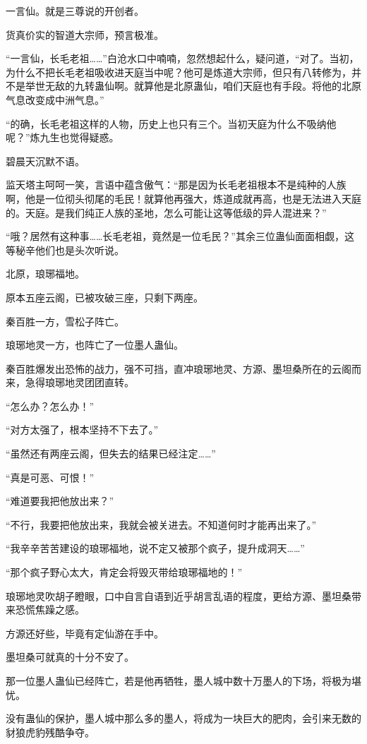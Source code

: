 \begin{this_body}
一言仙。就是三尊说的开创者。

货真价实的智道大宗师，预言极准。

“一言仙，长毛老祖……”白沧水口中喃喃，忽然想起什么，疑问道，“对了。当初，为什么不把长毛老祖吸收进天庭当中呢？他可是炼道大宗师，但只有八转修为，并不是举世无敌的九转蛊仙啊。就算他是北原蛊仙，咱们天庭也有手段。将他的北原气息改变成中洲气息。”

“的确，长毛老祖这样的人物，历史上也只有三个。当初天庭为什么不吸纳他呢？”炼九生也觉得疑惑。

碧晨天沉默不语。

监天塔主呵呵一笑，言语中蕴含傲气：“那是因为长毛老祖根本不是纯种的人族啊，他是一位彻头彻尾的毛民！就算他再强大，炼道成就再高，也是无法进入天庭的。天庭。是我们纯正人族的圣地，怎么可能让这等低级的异人混进来？”

“哦？居然有这种事……长毛老祖，竟然是一位毛民？”其余三位蛊仙面面相觑，这等秘辛他们也是头次听说。

北原，琅琊福地。

原本五座云阁，已被攻破三座，只剩下两座。

秦百胜一方，雪松子阵亡。

琅琊地灵一方，也阵亡了一位墨人蛊仙。

秦百胜爆发出恐怖的战力，强不可挡，直冲琅琊地灵、方源、墨坦桑所在的云阁而来，急得琅琊地灵团团直转。

“怎么办？怎么办！”

“对方太强了，根本坚持不下去了。”

“虽然还有两座云阁，但失去的结果已经注定……”

“真是可恶、可恨！”

“难道要我把他放出来？”

“不行，我要把他放出来，我就会被关进去。不知道何时才能再出来了。”

“我辛辛苦苦建设的琅琊福地，说不定又被那个疯子，提升成洞天……”

“那个疯子野心太大，肯定会将毁灭带给琅琊福地的！”

琅琊地灵吹胡子瞪眼，口中自言自语到近乎胡言乱语的程度，更给方源、墨坦桑带来恐慌焦躁之感。

方源还好些，毕竟有定仙游在手中。

墨坦桑可就真的十分不安了。

那一位墨人蛊仙已经阵亡，若是他再牺牲，墨人城中数十万墨人的下场，将极为堪忧。

没有蛊仙的保护，墨人城中那么多的墨人，将成为一块巨大的肥肉，会引来无数的豺狼虎豹残酷争夺。


\end{this_body}
